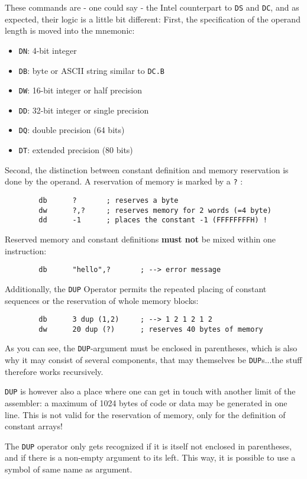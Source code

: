\documentclass[12pt,twoside]{report}
\newcommand{\bb}[1]{{\bf #1}}
\newcommand{\tty}[1]{{\tt #1}}
\begin{document}
These commands are - one could say - the Intel counterpart to \tty{DS} and
\tty{DC}, and as expected, their logic is a little bit different: First,
the specification of the operand length is moved into the mnemonic:
\begin{itemize}
\item{\tty{DN}: 4-bit integer}
\item{\tty{DB}: byte or ASCII string similar to \tty{DC.B}}
\item{\tty{DW}: 16-bit integer or half precision}
\item{\tty{DD}: 32-bit integer or single precision}
\item{\tty{DQ}: double precision   (64 bits)}
\item{\tty{DT}: extended precision (80 bits)}
\end{itemize}
Second, the distinction between constant definition and memory
reservation is done by the operand.  A reservation of memory is
marked by a \tty{?} :
\begin{verbatim}
        db      ?       ; reserves a byte
        dw      ?,?     ; reserves memory for 2 words (=4 byte)
        dd      -1      ; places the constant -1 (FFFFFFFFH) !
\end{verbatim}
Reserved memory and constant definitions \bb{must not} be mixed within one
instruction:
\begin{verbatim}
        db      "hello",?       ; --> error message
\end{verbatim}
Additionally, the \tty{DUP} Operator permits the repeated placing of
constant sequences or the reservation of whole memory blocks:
\begin{verbatim}
        db      3 dup (1,2)     ; --> 1 2 1 2 1 2
        dw      20 dup (?)      ; reserves 40 bytes of memory
\end{verbatim}
As you can see, the \tty{DUP}-argument must be enclosed in parentheses,
which is also why it may consist of several components, that may
themselves be \tty{DUP}s...the stuff therefore works recursively.

\tty{DUP} is however also a place where one can get in touch with another
limit of the assembler: a maximum of 1024 bytes of code or data may be
generated in one line.  This is not valid for the reservation of memory,
only for the definition of constant arrays!

The \tty{DUP} operator only gets recognized if it is itself not enclosed
in parentheses, and if there is a non-empty argument to its left.  This
way, it is possible to use a symbol of same name as argument.
\end{document}
